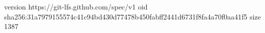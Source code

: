 version https://git-lfs.github.com/spec/v1
oid sha256:31a7979155574c41c94bd430d77478b450fabff2441d6731f8fa4a70f0aa41f5
size 1387
